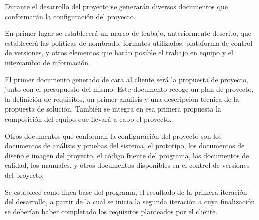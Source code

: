 Durante el desarrollo del proyecto se generarán diversos documentos que conformarán la configuración del proyecto.

En primer lugar se establecerá un marco de trabajo, anteriormente descrito, que establecerá las políticas de nombrado, formatos utilizados, plataforma de control de versiones, y otros elementos que harán posible el trabajo en equipo y el intercambio de información.

El primer documento generado de cara al cliente será la propuesta de proyecto, junto con el presupuesto del mismo. Este documento recoge un plan de proyecto, la definición de requisitos, un primer análisis y una descripción técnica de la propuesta de solución. También se integra en esa primera propuesta la composición del equipo que llevará a cabo el proyecto.

Otros documentos que conforman la configuración del proyecto son los documentos de análisis y pruebas del sistema, el prototipo, los documentos de diseño e imagen del proyecto, el código fuente del programa, los documentos de calidad, los manuales, y otros documentos disponibles en el control de versiones del proyecto.

Se establece como linea base del programa, el resultado de la primera iteración del desarrollo, a partir de la cual se inicia la segunda iteración a cuya finalización se deberían haber completado los requisitos planteados por el cliente.
